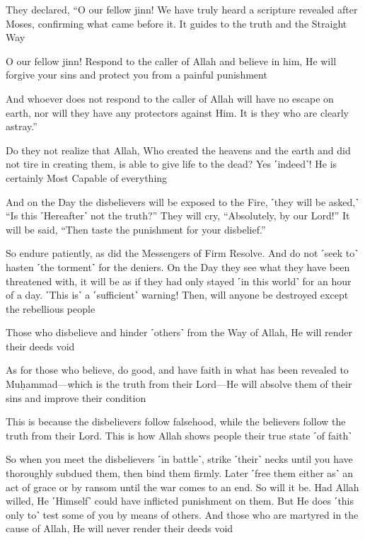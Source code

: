 They declared, “O our fellow jinn! We have truly heard a scripture revealed after Moses, confirming what came before it. It guides to the truth and the Straight Way

O our fellow jinn! Respond to the caller of Allah and believe in him, He will forgive your sins and protect you from a painful punishment

And whoever does not respond to the caller of Allah will have no escape on earth, nor will they have any protectors against Him. It is they who are clearly astray.”

Do they not realize that Allah, Who created the heavens and the earth and did not tire in creating them, is able to give life to the dead? Yes ˹indeed˺! He is certainly Most Capable of everything

And on the Day the disbelievers will be exposed to the Fire, ˹they will be asked,˺ “Is this ˹Hereafter˺ not the truth?” They will cry, “Absolutely, by our Lord!” It will be said, “Then taste the punishment for your disbelief.”

So endure patiently, as did the Messengers of Firm Resolve. And do not ˹seek to˺ hasten ˹the torment˺ for the deniers. On the Day they see what they have been threatened with, it will be as if they had only stayed ˹in this world˺ for an hour of a day. ˹This is˺ a ˹sufficient˺ warning! Then, will anyone be destroyed except the rebellious people

Those who disbelieve and hinder ˹others˺ from the Way of Allah, He will render their deeds void

As for those who believe, do good, and have faith in what has been revealed to Muḥammad—which is the truth from their Lord—He will absolve them of their sins and improve their condition

This is because the disbelievers follow falsehood, while the believers follow the truth from their Lord. This is how Allah shows people their true state ˹of faith˺

So when you meet the disbelievers ˹in battle˺, strike ˹their˺ necks until you have thoroughly subdued them, then bind them firmly. Later ˹free them either as˺ an act of grace or by ransom until the war comes to an end. So will it be. Had Allah willed, He ˹Himself˺ could have inflicted punishment on them. But He does ˹this only to˺ test some of you by means of others. And those who are martyred in the cause of Allah, He will never render their deeds void

